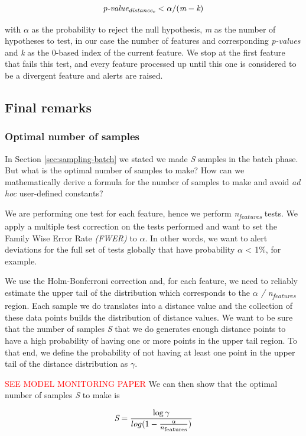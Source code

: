 \[  \textit{p-value\textsubscript{distance\textsubscript{x}}} < \alpha / (\textit{m} - \textit{k}) \]

with $\alpha$ as the probability to reject the null hypothesis, \textit{m} as the number of hypotheses to test, in our case the number of features and corresponding \textit{p-values} and \textit{k} as the 0-based index of the current feature. We stop at the first feature that fails this test, and every feature processed up until this one is considered to be a divergent feature and alerts are raised.

\subsection{Final remarks}

\subsubsection*{Optimal number of samples}
In Section \ref{sec:sampling-batch} we stated we made \textit{S} samples in the batch phase. But what is the optimal number of samples to make? How can we mathematically derive a formula for the number of samples to make and avoid \textit{ad hoc} user-defined constants?

We are performing one test for each feature, hence we perform \textit{n\textsubscript{features}} tests. We apply a multiple test correction on the tests performed and want to set the Family Wise Error Rate \textit{(FWER)} to $\alpha$. In other words, we want to alert deviations for the full set of tests globally that have probability $\alpha$ < 1\%, for example.

We use the Holm-Bonferroni correction and, for each feature, we need to reliably estimate the upper tail of the distribution which corresponds to the \textit{$\alpha$ / n\textsubscript{features}} region. Each sample we do translates into a distance value and the collection of these data points builds the distribution of distance values. We want to be sure that the number of samples \textit{S} that we do generates enough distance points to have a high probability of having one or more points in the upper tail region. To that end, we define the probability of not having at least one point in the upper tail of the distance distribution as $\gamma$. 

\textcolor{red}{SEE MODEL MONITORING PAPER} We can then show that the optimal number of samples \textit{S} to make is

\begin{equation}
    \label{eq:optimal-n-samples}
    \textit{S} = \frac{\log\gamma}{log(1 - \frac{\alpha}{n\textsubscript{features}})}
\end{equation}





